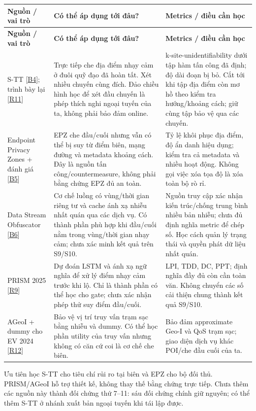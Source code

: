 \documentclass[10pt,a4paper]{article}
\begin{document}
\begingroup\small
\begin{longtable}{@{}P{3.347cm}P{6.891cm}P{6.399cm}@{}}
\toprule
\textbf{Nguồn / vai trò} & \textbf{Có thể áp dụng tới đâu?} & \textbf{Metrics / điều cần học}\\\midrule
\endfirsthead
\toprule
\textbf{Nguồn / vai trò} & \textbf{Có thể áp dụng tới đâu?} & \textbf{Metrics / điều cần học}\\\midrule
\endhead
\bottomrule\endfoot
S-TT [\hyperlink{ref-B4}{B4}]; trình bày lại [\hyperlink{ref-R11}{R11}] & Trực tiếp che địa điểm nhạy cảm ở đuôi quỹ đạo đã hoàn tất. Xét nhiều chuyến cùng đích. Đảo chiều hình học để xét đầu chuyến là phép thích nghi ngoại tuyến của ta, không phải bảo đảm online. & k-site-unidentifiability dưới tập hàm tấn công đã định; độ dài đoạn bị bỏ. Cắt tới khi tập địa điểm còn mơ hồ theo kiểm tra hướng/khoảng cách; giữ cùng tập bảo vệ qua các chuyến.\\
\addlinespace[3pt]
Endpoint Privacy Zones + đánh giá [\hyperlink{ref-B5}{B5}] & EPZ che đầu/cuối nhưng vẫn có thể bị suy từ điểm biên, mạng đường và metadata khoảng cách. Đây là nguồn tấn công/countermeasure, không phải bằng chứng EPZ đủ an toàn. & Tỷ lệ khôi phục địa điểm, độ ẩn danh hiệu dụng; kiểm tra cả metadata và nhiều hoạt động. Không gọi việc xóa tọa độ là xóa toàn bộ rò rỉ.\\
\addlinespace[3pt]
Data Stream Obfuscator [\hyperlink{ref-B6}{B6}] & Cơ chế luồng có vùng/thời gian riêng tư và cache ánh xạ nhiễu nhất quán qua các dịch vụ. Có thành phần phù hợp khi đầu/cuối nằm trong vùng/thời gian nhạy cảm; chưa xác minh kết quả trên S9/S10. & Nguồn truy cập xác nhận kiến trúc/chống trung bình nhiều bản nhiễu; chưa đủ định nghĩa metric để chép số. Học cách quản lý trạng thái và quyền phát dữ liệu nhất quán.\\
\addlinespace[3pt]
PRISM 2025 [\hyperlink{ref-R9}{R9}] & Dự đoán LSTM và ánh xạ ngữ nghĩa để xử lý điểm nhạy cảm trước khi lộ. Chỉ là thành phần có thể học cho gate; chưa xác nhận phép thử suy điểm đầu/cuối. & LPI, TDD, DC, PPT; định nghĩa đầy đủ còn cần toàn văn. Không chuyển các số cải thiện chung thành kết quả S9/S10.\\
\addlinespace[3pt]
AGeoI + dummy cho EV 2024 [\hyperlink{ref-R12}{R12}] & Bảo vệ vị trí truy vấn trạm sạc bằng nhiễu và dummy. Có thể học phần utility của truy vấn nhưng không có căn cứ coi là cơ chế che biên. & Bảo đảm approximate Geo-I và QoS trạm sạc; giao diện dịch vụ khác POI/che đầu cuối của ta.\\
\end{longtable}
\endgroup
Ưu tiên học S-TT cho tiêu chí rủi ro tại biên và EPZ cho bộ đối thủ. PRISM/AGeoI hỗ trợ thiết kế, không thay thế bằng chứng trực tiếp. Chưa thêm các nguồn này thành đối chứng thứ 7–11: sáu đối chứng chính giữ nguyên; có thể thêm S-TT ở nhánh xuất bản ngoại tuyến khi tái lập được.
\end{document}
